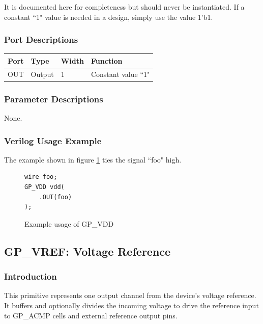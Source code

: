 \documentclass[11pt]{article}
\begin{document}
It is documented here for completeness but should never be instantiated. If a constant ``1" value is needed in a 
design, simply use the value 1'b1.

\subsubsection{Port Descriptions}

\begin{tabularx}{4in}{|l|l|l|X|}
\hline
{\bfseries Port} & {\bfseries Type} & {\bfseries Width} & {\bfseries Function} \\
\hline
OUT & Output & 1 & Constant value ``1" \\
\hline
\end{tabularx}

\subsubsection{Parameter Descriptions}

None.

\subsubsection{Verilog Usage Example}

The example shown in figure \ref{gp-vdd-example} ties the signal ``foo" high.

\begin{figure}[h]
\begin{lstlisting}
wire foo;
GP_VDD vdd(
	.OUT(foo)
);
\end{lstlisting}
\caption{Example usage of GP\_VDD}
\label{gp-vdd-example}
\end{figure}


\pagebreak
\subsection{GP\_VREF: Voltage Reference}

\subsubsection{Introduction}
This primitive represents one output channel from the device's voltage reference. It buffers and optionally divides the 
incoming voltage to drive the reference input to GP\_ACMP cells and external reference output pins.
\end{document}
